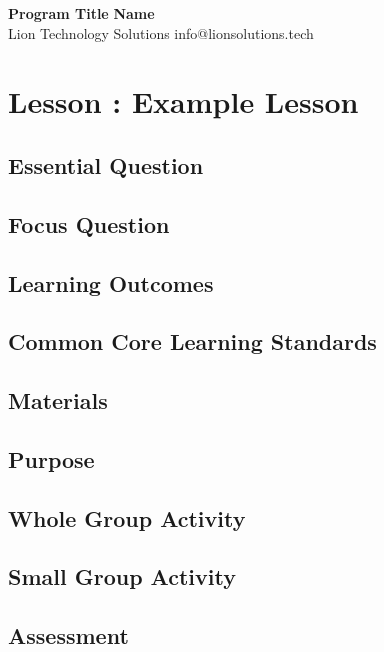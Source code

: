 \documentclass[a4paper, 11pt]{article}
\begin{document}
\vspace*{-0.75in}
\noindent\LARGE\textbf{Program Title} \hfill \textbf{Name} \\
\normalsize {Lion Technology Solutions} \hfill info@lionsolutions.tech \\
\normalsize 

\section*{Lesson : Example Lesson}

\subsection*{Essential Question}


\subsection*{Focus Question}


\subsection*{Learning Outcomes}
 
 
\subsection*{Common Core Learning Standards}


\subsection*{Materials}


\subsection*{Purpose}


\subsection*{Whole Group Activity}


\subsection*{Small Group Activity}


\subsection*{Assessment}
\end{document}
